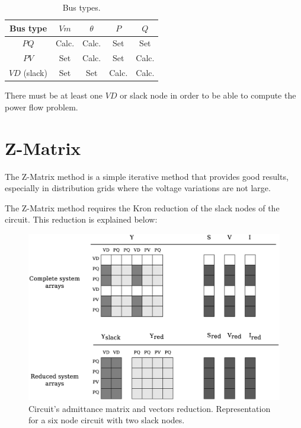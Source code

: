 \documentclass[nols,a4paper,twoside,notoc,fleqn]{tufte-book}
\begin{document}
\begin{table}[h!]
	\begin{center}
		\begin{tabular}{ccccc}
			\toprule
			
			Bus type & $Vm$ &  $\theta$ & $P$ & $Q$\\
			
			\midrule
			
			$PQ$ & Calc. &  Calc. & Set & Set\\
			$PV$ & Set &  Calc. & Set & Calc.\\
			$VD$ (slack) & Set &  Set & Calc. & Calc.\\
			
			
			\bottomrule
		\end{tabular}
	\end{center}
	\caption{Bus types.}
	\label{bus__types}
\end{table}

There must be at least one $VD$ or slack node in order to be able to compute the power flow problem. 



\section{Z-Matrix}

The Z-Matrix method is a simple iterative method that provides good results, especially in distribution grids where the voltage variations are not large.

The Z-Matrix method requires the Kron reduction of the slack nodes of the circuit. This reduction is explained below:

\begin{figure}[h!]
  \includegraphics[width=\linewidth]{img/Matrix_reduction.eps}
  \caption{Circuit's admittance matrix and vectors reduction. Representation for a six node circuit with two slack nodes.}
  \label{fig:reduction}
\end{figure}
\end{document}

